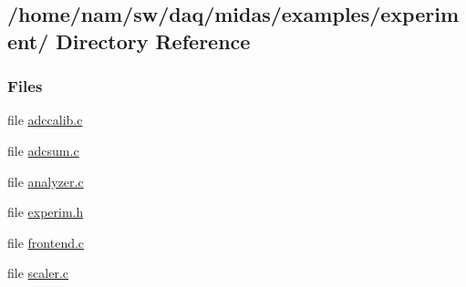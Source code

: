 \subsection{/home/nam/sw/daq/midas/examples/experiment/ Directory Reference}
\label{dir_288d0dd33e80f6fcf7be362cbb57445e}
\subsubsection*{Files}
\begin{DoxyCompactItemize}
\item 
file \hyperlink{adccalib_8c}{adccalib.c}
\item 
file \hyperlink{adcsum_8c}{adcsum.c}
\item 
file \hyperlink{analyzer_8c}{analyzer.c}
\item 
file \hyperlink{experim_8h}{experim.h}
\item 
file \hyperlink{frontend_8c}{frontend.c}
\item 
file \hyperlink{scaler_8c}{scaler.c}
\end{DoxyCompactItemize}
